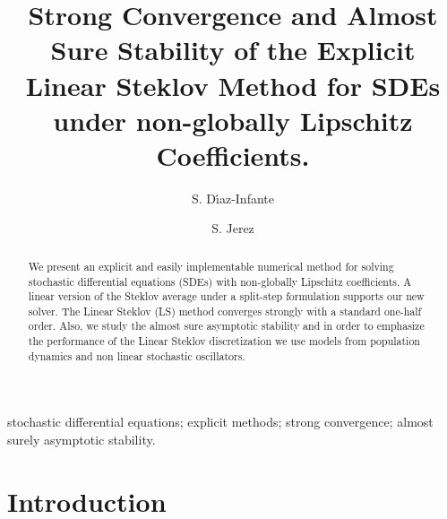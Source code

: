 \documentclass[3p]{elsarticle}
\theoremstyle{definition}
\theoremstyle{plain}%
\theoremstyle{remark}
\newcommand{\SM}{LS\xspace}
\begin{document}
	\begin{frontmatter}
		\title{
				Strong Convergence and Almost Sure Stability of the Explicit Linear Steklov Method
				for SDEs under non-globally Lipschitz Coefficients.
		}%
		\author[sj]{S. D\'{\i}az-Infante}
		\author[sj]{S. Jerez}
		\address[sj]{Split Step Linear Steklov Method 
		Department of Applied Mathematics, CIMAT, Guanajuato, Gto., Mexico,
		36240.
		}
	\begin{abstract}
		We present an explicit and easily implementable numerical method for
		solving stochastic differential equations (SDEs) with non-globally Lipschitz
		coefficients. A linear version of the Steklov average under a split-step formulation supports our new solver.
		The Linear Steklov (\SM) method converges strongly with a standard 
		one-half order.  Also, we study the almost sure asymptotic stability and in  order to emphasize the 
		performance of the Linear Steklov discretization we use models from population dynamics 
		and non linear stochastic oscillators.
	\end{abstract}
	\begin{keyword}
		stochastic differential equations;
		explicit methods; strong convergence; almost surely asymptotic stability.
	\end{keyword}
	\end{frontmatter}
	\section{Introduction} 
\end{document}
